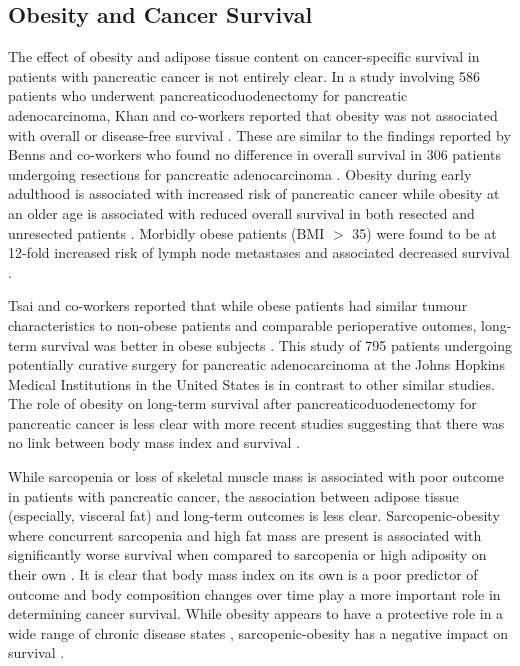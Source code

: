\subsection{Obesity and Cancer Survival}

The effect of obesity and adipose tissue content on cancer-specific survival in patients with pancreatic cancer is not entirely clear. 
In a study involving 586 patients who underwent pancreaticoduodenectomy for pancreatic adenocarcinoma, Khan and co-workers reported that obesity was not associated with overall or disease-free survival \parencite{khan_does_2010}. 
These are similar to the findings reported by Benns and co-workers who found no difference in overall survival in 306 patients undergoing resections for pancreatic adenocarcinoma \parencite{benns_impact_2009}. 
Obesity during early adulthood is associated with increased risk of pancreatic cancer while obesity at an older age is associated with reduced overall survival in both resected and unresected patients \parencite{li_body_2009}. 
Morbidly obese patients (BMI $>$ 35) were found to be at 12-fold increased risk of lymph node metastases and associated decreased survival \parencite{fleming_influence_2009}.

Tsai and co-workers reported that while obese patients had similar tumour characteristics to non-obese patients and comparable perioperative outomes, long-term survival was better in obese subjects \parencite{tsai_impact_2010}. 
This study of 795 patients undergoing potentially curative surgery for pancreatic adenocarcinoma at the Johns Hopkins Medical Institutions in the United States is in contrast to other similar studies. 
The role of obesity on long-term survival after pancreaticoduodenectomy for pancreatic cancer is less clear with more recent studies suggesting that there was no link between body mass index and survival \parencite{dandona_influence_2011, benns_impact_2009}.

While sarcopenia or loss of skeletal muscle mass is associated with poor outcome in patients with pancreatic cancer, the association between adipose tissue (especially, visceral fat) and long-term outcomes is less clear. 
Sarcopenic-obesity where concurrent sarcopenia and high fat mass are present is associated with significantly worse survival when compared to sarcopenia or high adiposity on their own \parencite{tan_sarcopenia_2009}. 
It is clear that body mass index on its own is a poor predictor of outcome and body composition changes over time play a more important role in determining cancer survival. 
While obesity appears to have a protective role in a wide range of chronic disease states \parencite{kalantar-zadeh_risk_2007, amundson_obesity_2010, myers_obesity_2011}, sarcopenic-obesity has a negative impact on survival \parencite{tan_sarcopenia_2009}.

